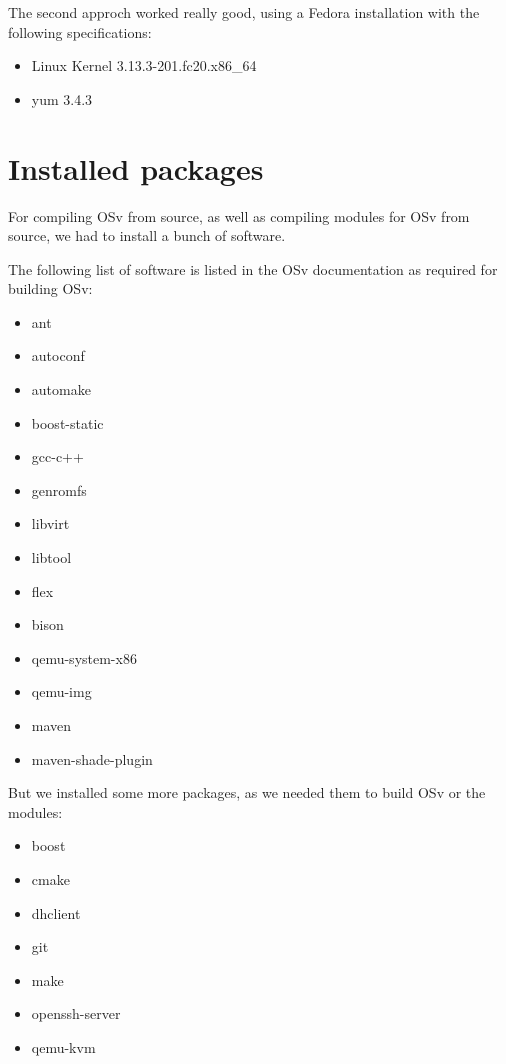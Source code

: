     The second approch worked really good, using a Fedora installation with the
    following specifications:

        \begin{itemize}
            \item Linux Kernel 3.13.3-201.fc20.x86\_64
            \item yum 3.4.3
        \end{itemize}

    \section{Installed packages}

        For compiling OSv from source, as well as compiling modules for OSv from
        source, we had to install a bunch of software.

        The following list of software is listed in the OSv documentation as
        required for building OSv:

            \begin{itemize}
                \item ant
                \item autoconf
                \item automake
                \item boost-static
                \item gcc-c++
                \item genromfs
                \item libvirt
                \item libtool
                \item flex
                \item bison
                \item qemu-system-x86
                \item qemu-img
                \item maven
                \item maven-shade-plugin
            \end{itemize}

        But we installed some more packages, as we needed them to build OSv or
        the modules:

            \begin{itemize}
                \item boost
                \item cmake
                \item dhclient
                \item git
                \item make
                \item openssh-server
                \item qemu-kvm
            \end{itemize}


